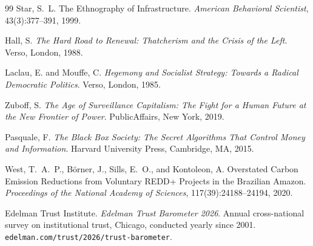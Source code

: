 \documentclass[11pt,a4paper]{article}
\theoremstyle{remark}
\begin{document}
\begin{thebibliography}{99}
Star, S.~L.
\newblock The Ethnography of Infrastructure.
\newblock \emph{American Behavioral Scientist}, 43(3):377--391, 1999.

Hall, S.
\newblock \emph{The Hard Road to Renewal: Thatcherism and the Crisis
  of the Left}.
\newblock Verso, London, 1988.

Laclau, E. and Mouffe, C.
\newblock \emph{Hegemony and Socialist Strategy: Towards a Radical
  Democratic Politics}.
\newblock Verso, London, 1985.

Zuboff, S.
\newblock \emph{The Age of Surveillance Capitalism: The Fight for a
  Human Future at the New Frontier of Power}.
\newblock PublicAffairs, New York, 2019.

Pasquale, F.
\newblock \emph{The Black Box Society: The Secret Algorithms That
  Control Money and Information}.
\newblock Harvard University Press, Cambridge, MA, 2015.

West, T.~A.~P., B\"orner, J., Sills, E.~O., and Kontoleon, A.
\newblock Overstated Carbon Emission Reductions from Voluntary
  REDD+ Projects in the Brazilian Amazon.
\newblock \emph{Proceedings of the National Academy of Sciences},
  117(39):24188--24194, 2020.

Edelman Trust Institute.
\newblock \emph{Edelman Trust Barometer 2026}.
\newblock Annual cross-national survey on institutional trust,
  Chicago, conducted yearly since 2001.
  \texttt{edelman.com/trust/2026/trust-barometer}.

\end{thebibliography}
\end{document}
